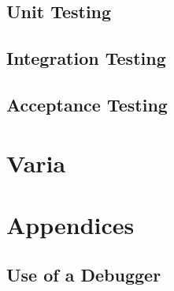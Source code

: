 \documentclass[a4paper]{article}
\begin{document}
\subsection{Unit Testing}

\subsection{Integration Testing}

\subsection{Acceptance Testing}

\section{Varia}

\section{Appendices}

\subsection{Use of a Debugger}
\end{document}
